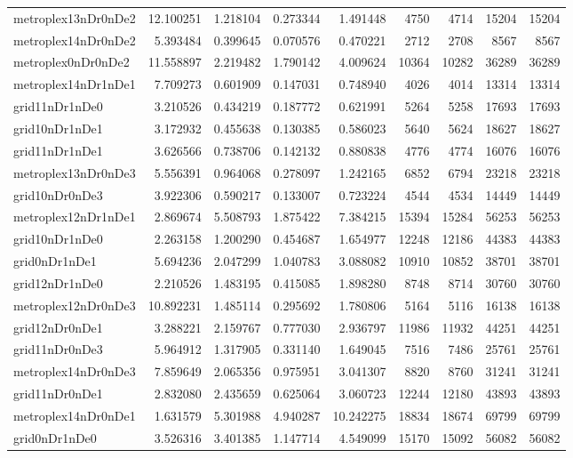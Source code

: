 \begin{longtable}{|l|r|r|r|r|r|r|r|r|}
metroplex13nDr0nDe2 & 12.100251 & 1.218104 & 0.273344 & 1.491448 & 4750 & 4714 & 15204 & 15204 \\
metroplex14nDr0nDe2 & 5.393484 & 0.399645 & 0.070576 & 0.470221 & 2712 & 2708 & 8567 & 8567 \\
metroplex0nDr0nDe2 & 11.558897 & 2.219482 & 1.790142 & 4.009624 & 10364 & 10282 & 36289 & 36289 \\
metroplex14nDr1nDe1 & 7.709273 & 0.601909 & 0.147031 & 0.748940 & 4026 & 4014 & 13314 & 13314 \\
grid11nDr1nDe0 & 3.210526 & 0.434219 & 0.187772 & 0.621991 & 5264 & 5258 & 17693 & 17693 \\
grid10nDr1nDe1 & 3.172932 & 0.455638 & 0.130385 & 0.586023 & 5640 & 5624 & 18627 & 18627 \\
grid11nDr1nDe1 & 3.626566 & 0.738706 & 0.142132 & 0.880838 & 4776 & 4774 & 16076 & 16076 \\
metroplex13nDr0nDe3 & 5.556391 & 0.964068 & 0.278097 & 1.242165 & 6852 & 6794 & 23218 & 23218 \\
grid10nDr0nDe3 & 3.922306 & 0.590217 & 0.133007 & 0.723224 & 4544 & 4534 & 14449 & 14449 \\
metroplex12nDr1nDe1 & 2.869674 & 5.508793 & 1.875422 & 7.384215 & 15394 & 15284 & 56253 & 56253 \\
grid10nDr1nDe0 & 2.263158 & 1.200290 & 0.454687 & 1.654977 & 12248 & 12186 & 44383 & 44383 \\
grid0nDr1nDe1 & 5.694236 & 2.047299 & 1.040783 & 3.088082 & 10910 & 10852 & 38701 & 38701 \\
grid12nDr1nDe0 & 2.210526 & 1.483195 & 0.415085 & 1.898280 & 8748 & 8714 & 30760 & 30760 \\
metroplex12nDr0nDe3 & 10.892231 & 1.485114 & 0.295692 & 1.780806 & 5164 & 5116 & 16138 & 16138 \\
grid12nDr0nDe1 & 3.288221 & 2.159767 & 0.777030 & 2.936797 & 11986 & 11932 & 44251 & 44251 \\
grid11nDr0nDe3 & 5.964912 & 1.317905 & 0.331140 & 1.649045 & 7516 & 7486 & 25761 & 25761 \\
metroplex14nDr0nDe3 & 7.859649 & 2.065356 & 0.975951 & 3.041307 & 8820 & 8760 & 31241 & 31241 \\
grid11nDr0nDe1 & 2.832080 & 2.435659 & 0.625064 & 3.060723 & 12244 & 12180 & 43893 & 43893 \\
metroplex14nDr0nDe1 & 1.631579 & 5.301988 & 4.940287 & 10.242275 & 18834 & 18674 & 69799 & 69799 \\
grid0nDr1nDe0 & 3.526316 & 3.401385 & 1.147714 & 4.549099 & 15170 & 15092 & 56082 & 56082 \\

\end{longtable}
